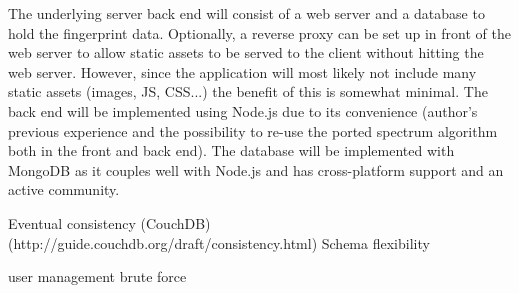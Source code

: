 \documentclass[thesis.tex]{subfiles}
\begin{document}
The underlying server back end will consist of a web server and a database to hold the fingerprint data. Optionally, a reverse proxy can be set up in front of the web server to allow static assets to be served to the client without hitting the web server. However, since the application will most likely not include many static assets (images, JS, CSS...) the benefit of this is somewhat minimal. The back end will be implemented using Node.js due to its convenience (author's previous experience and the possibility to re-use the ported spectrum algorithm both in the front and back end). The database will be implemented with MongoDB as it couples well with Node.js and has cross-platform support and an active community.

Eventual consistency (CouchDB) (http://guide.couchdb.org/draft/consistency.html)
Schema flexibility

user management brute force
\end{document}
